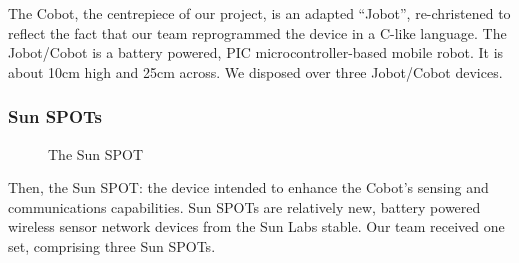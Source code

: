 \documentclass[a4paper,10pt]{article} %
\begin{document}
The Cobot, the centrepiece of our project, is an adapted ``Jobot'',
re-christened to reflect the fact that our team reprogrammed the device in a
C-like language. The Jobot/Cobot is a battery powered, PIC microcontroller-based
mobile robot. It is about 10cm high and 25cm across. We disposed over three
Jobot/Cobot devices.

\subsubsection{Sun SPOTs}

\begin{figure}[H]
    \centering
    \caption{The Sun SPOT}
    \label{fig:sunspotviews}
\end{figure}

Then, the Sun SPOT: the device intended to enhance the Cobot's sensing and
communications capabilities. Sun SPOTs are relatively new, battery powered
wireless sensor network devices from the Sun Labs stable. Our team received one
set, comprising three Sun SPOTs.
\end{document}
